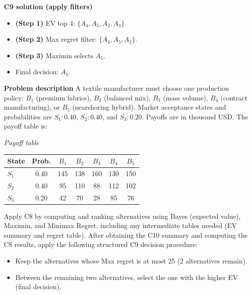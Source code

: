 \begin{ExamProblems}
		\textbf{C9 solution (apply filters)}\par
		\begin{itemize}
			\item \textbf{(Step 1)} EV top 4: $\{A_4,A_5,A_2,A_3\}$.
			\item \textbf{(Step 2)} Max regret filter: $\{A_4,A_5,A_2\}$.
			\item \textbf{(Step 3)} Maximin selects $A_5$.
			\item Final decision: $A_5$.
		\end{itemize}
		
		\newpage
		\item
		\textbf{Problem description}
		A textile manufacturer must choose one production policy: $B_1$ (premium fabrics), $B_2$ (balanced mix), $B_3$ (mass volume), $B_4$ (contract manufacturing), or $B_5$ (nearshoring hybrid).
		Market acceptance states and probabilities are $S_1:0.40$, $S_2:0.40$, and $S_3:0.20$. Payoffs are in thousand USD. The payoff table is:
		
		\begin{center}
			\textit{Payoff table} \\
			\begin{tabular}{l c c c c c c}
				\hline
				State& Prob. & $B_1$ & $B_2$ & $B_3$ & $B_4$ & $B_5$ \\
				\hline
				$S_1$ & 0.40 & 145 & 138 & 160 & 130 & 150 \\
				$S_2$ & 0.40 & 95 & 110 & 88 & 112 & 102 \\
				$S_3$ & 0.20 & 42 & 70 & 28 & 85 & 76 \\
				\hline
			\end{tabular}
		\end{center}
		
		Apply C8 by computing and ranking alternatives using Bayes (expected value), Maximin, and Minimax Regret, including any intermediate tables needed (EV summary and regret table).
		After obtaining the C10 summary and computing the C8 results, apply the following structured C9 decision procedure:
		\begin{itemize}
			\item Keep the alternatives whose Max regret is at most 25 (2 alternatives remain).
			\item Between the remaining two alternatives, select the one with the higher EV (final decision).
		\end{itemize}
		
		\vspace{0.25cm}
		

\end{ExamProblems}
